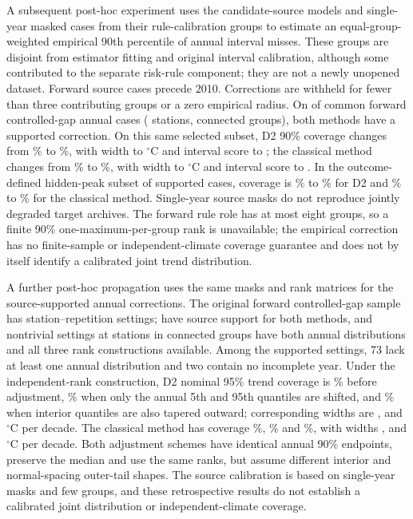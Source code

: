 \documentclass[draft,linenumbers]{agujournal2025}
\begin{document}
A subsequent post-hoc experiment uses the candidate-source models and single-year masked cases from their rule-calibration groups to estimate an equal-group-weighted empirical 90th percentile of annual interval misses. These groups are disjoint from estimator fitting and original interval calibration, although some contributed to the separate risk-rule component; they are not a newly unopened dataset. Forward source cases precede 2010. Corrections are withheld for fewer than three contributing groups or a zero empirical radius. On \SYAllSupported{} of \SYAllEligible{} common forward controlled-gap annual cases (\SYAllStations{} stations, \SYAllGroups{} connected groups), both methods have a supported correction. On this same selected subset, D2 90\% coverage changes from \SYDTwoBase\% to \SYDTwoExpanded\%, with width \SYDTwoWidthBase{} to \SYDTwoWidthExpanded{}$^{\circ}$C and interval score \SYDTwoScoreBase{} to \SYDTwoScoreExpanded{}; the classical method changes from \SYClassicBase\% to \SYClassicExpanded\%, with width \SYClassicWidthBase{} to \SYClassicWidthExpanded{}$^{\circ}$C and interval score \SYClassicScoreBase{} to \SYClassicScoreExpanded{}. In the outcome-defined hidden-peak subset of \SYHiddenSupported{} supported cases, coverage is \SYHiddenDTwoBase\% to \SYHiddenDTwoExpanded\% for D2 and \SYHiddenClassicBase\% to \SYHiddenClassicExpanded\% for the classical method. Single-year source masks do not reproduce jointly degraded target archives. The forward rule role has at most eight groups, so a finite 90\% one-maximum-per-group rank is unavailable; the empirical correction has no finite-sample or independent-climate coverage guarantee and does not by itself identify a calibrated joint trend distribution.

A further post-hoc propagation uses the same masks and rank matrices for the source-supported annual corrections. The original forward controlled-gap sample has \SYTrendAll{} station--repetition settings; \SYTrendSupported{} have source support for both methods, and \SYTrendCommon{} nontrivial settings at \SYTrendStations{} stations in \SYTrendGroups{} connected groups have both annual distributions and all three rank constructions available. Among the supported settings, 73 lack at least one annual distribution and two contain no incomplete year. Under the independent-rank construction, D2 nominal 95\% trend coverage is \SYTrendDTwoBase\% before adjustment, \SYTrendDTwoEnd\% when only the annual 5th and 95th quantiles are shifted, and \SYTrendDTwoTaper\% when interior quantiles are also tapered outward; corresponding widths are \SYTrendDTwoWidthBase{}, \SYTrendDTwoWidthEnd{} and \SYTrendDTwoWidthTaper{}$^{\circ}$C per decade. The classical method has coverage \SYTrendClassicBase\%, \SYTrendClassicEnd\% and \SYTrendClassicTaper\%, with widths \SYTrendClassicWidthBase{}, \SYTrendClassicWidthEnd{} and \SYTrendClassicWidthTaper{}$^{\circ}$C per decade. Both adjustment schemes have identical annual 90\% endpoints, preserve the median and use the same ranks, but assume different interior and normal-spacing outer-tail shapes. The source calibration is based on single-year masks and few groups, and these retrospective results do not establish a calibrated joint distribution or independent-climate coverage.
\end{document}
